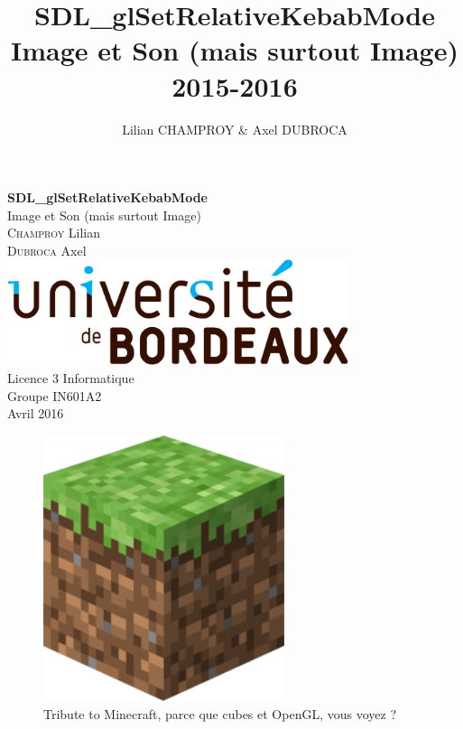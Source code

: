 \documentclass[10pt,a4paper]{report}
\title{SDL\_glSetRelativeKebabMode\\\large{}Image et Son (mais surtout Image)\\2015-2016}
\author{Lilian CHAMPROY & Axel DUBROCA}
\begin{document}
\begin{titlepage}
   \begin{center}
       \vspace*{3cm}
       \LARGE
       \textbf{\huge{}SDL\_glSetRelativeKebabMode}\\[0.25cm]
       \LARGE
       Image et Son (mais surtout Image)\\[2.5cm]
       \textsc{Champroy} Lilian\\
       \textsc{Dubroca} Axel\\
       \vfill  
        \includegraphics[width=10cm]{Logo-Universite.png}\\[3cm]  
       \Large
       Licence 3 Informatique\\
       Groupe IN601A2\\
       Avril 2016
   \end{center}
\end{titlepage}

\pagestyle{headings}
\setcounter{tocdepth}{1}

\begin{figure}[tp]
\centering
\includegraphics[width=200pt]{Minecraft.png}
\caption{Tribute to Minecraft, parce que cubes et OpenGL, vous voyez ?}
\end{figure}

\newpage


\newpage

\newpage

\newpage
\end{document}
